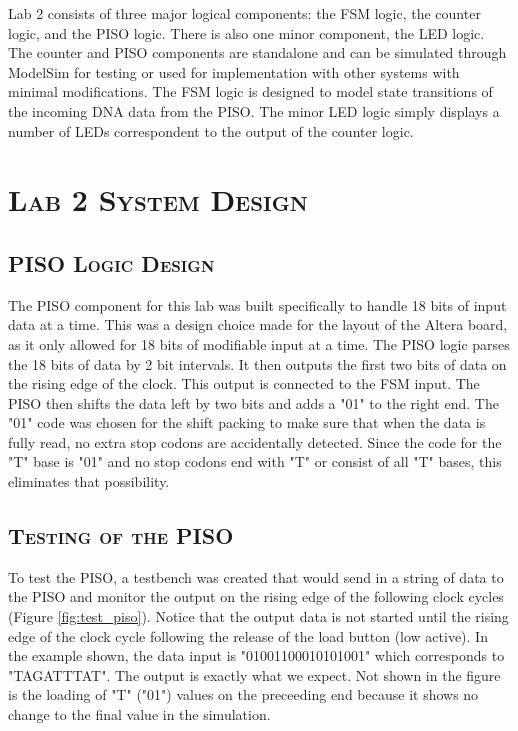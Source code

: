 \documentclass[11pt]{report}
\begin{document}
\begin{spacing}{1.5}
Lab 2 consists of three major logical components: the FSM logic, the counter logic, and the PISO logic. There is also one minor component, the LED logic.  The counter and PISO components are standalone and can be simulated through ModelSim for testing or used for implementation with other systems with minimal modifications.  The FSM logic is designed to model state transitions of the incoming DNA data from the PISO.  The minor LED logic simply displays a number of LEDs correspondent to the output of the counter logic.

\section{\scshape Lab 2 System Design} %
\label{sec:fsm_design}

\subsection{\scshape PISO Logic Design}
\label{sub:design_piso}

The PISO component for this lab was built specifically to handle 18 bits of input data at a time.  This was a design choice made for the layout of the Altera board, as it only allowed for 18 bits of modifiable input at a time. The PISO logic parses the 18 bits of data by 2 bit intervals.  It then outputs the first two bits of data on the rising edge of the clock.  This output is connected to the FSM input.  The PISO then shifts the data left by two bits and adds a "01" to the right end.  The "01" code was chosen for the shift packing to make sure that when the data is fully read, no extra stop codons are accidentally detected.  Since the code for the "T" base is "01" and no stop codons end with "T" or consist of all "T" bases, this eliminates that possibility.

\subsection{\scshape Testing of the PISO}
\label{sub:test_piso}

To test the PISO, a testbench was created that would send in a string of data to the PISO and monitor the output on the rising edge of the following clock cycles (Figure \ref{fig:test_piso}). Notice that the output data is not started until the rising edge of the clock cycle following the release of the load button (low active).  In the example shown, the data input is "01001100010101001" which corresponds to "TAGATTTAT".  The output is exactly what we expect. Not shown in the figure is the loading of "T" ("01") values on the preceeding end because it shows no change to the final value in the simulation.


\end{spacing}
\end{document}
